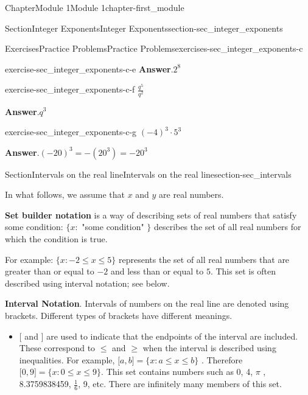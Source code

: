 \documentclass[oneside,10pt,]{book}
\newcommand{\blocktitlefont}{\relax}
\newcommand{\terminology}[1]{\textbf{#1}}
\begin{document}
\begin{chapterptx}{Chapter}{Module 1}{}{Module 1}{}{}{chapter-first_module}
\begin{sectionptx}{Section}{Integer Exponents}{}{Integer Exponents}{}{}{section-sec_integer_exponents}
\begin{exercises-subsection-numberless}{Exercises}{Practice Problems}{}{Practice Problems}{}{}{exercises-sec_integer_exponents-c}
\begin{divisionexercise}{3}{}{}{exercise-sec_integer_exponents-c-e}
\noindent\textbf{\blocktitlefont Answer}.\hypertarget{answer-sec_integer_exponents-c-e-b}{}\quad{}\(2^8\)%
\end{divisionexercise}%
\begin{divisionexercise}{4}{}{}{exercise-sec_integer_exponents-c-f}%
\(\frac{q^5}{q^2}\)%
\par\smallskip%
\noindent\textbf{\blocktitlefont Answer}.\hypertarget{answer-sec_integer_exponents-c-f-b}{}\quad{}\(q^3\)%
\end{divisionexercise}%
\begin{divisionexercise}{5}{}{}{exercise-sec_integer_exponents-c-g}%
\((-4)^3 \cdot 5^3\)%
\par\smallskip%
\noindent\textbf{\blocktitlefont Answer}.\hypertarget{answer-sec_integer_exponents-c-g-b}{}\quad{}\((-20)^3 = - (20^3) = -20^3\)%
\end{divisionexercise}%
\end{exercises-subsection-numberless}
\end{sectionptx}
%
%
\typeout{************************************************}
\typeout{************************************************}
%
\begin{sectionptx}{Section}{Intervals on the real line}{}{Intervals on the real line}{}{}{section-sec_intervals}
\begin{introduction}{}%
In what follows, we assume that \(x\) and \(y\) are real numbers.%
\par
{}\terminology{Set builder notation} is a way of describing sets of real numbers that satisfy some condition: \(\{ x:\) "some condition" \(\}\) describes the set of all real numbers for which the condition is true.%
\par
For example: \(\{ x : -2 \leq x \leq 5 \}\) represents the set of all real numbers that are greater than or equal to \(-2\) and less than or equal to \(5\).  This set is often described using interval notation; see below.%
\par
{}\terminology{Interval Notation}.  Intervals of numbers on the real line are denoted using brackets.  Different types of brackets have different meanings.%
%
\begin{itemize}[label=\textbullet]
\item{}\(\big[\) and \(\big]\) are used to indicate that the endpoints of the interval are included.  These correspond to \(\leq\) and \(\geq\) when the interval is described using inequalities.  For example, \(\big[ a, b \big] = \{ x: a\leq x\leq b\}\) . Therefore \(\big[ 0, 9 \big] = \{ x : 0 \leq x \leq 9 \}\).  This set contains numbers such as 0, 4, \(\pi\) , 8.3759838459, \(\frac{1}{6}\), 9, etc.  There are infinitely many members of this set.%

\end{itemize}
\end{introduction}
\end{sectionptx}
\end{chapterptx}
\end{document}
